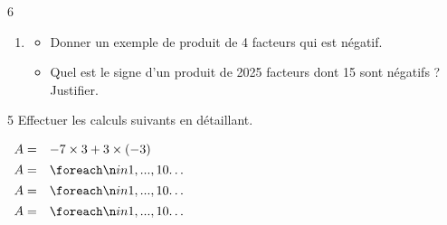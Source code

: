 \documentclass[a4paper]{book}
\begin{document}
{\begin{exerciceNote}{6}
\begin{enumerate}
\begin{enumerate}
\begin{itemize}
                    \medskip
                    
                    \item Si ce nombre est \points[10], alors le résultat est \points[10]
                \end{itemize}
            \end{enumerate}

            \item \begin{itemize}
                \item Donner un exemple de produit de 4 facteurs qui est négatif.

                \medskip

                \points[30]

                \item Quel est le signe d'un produit de 2025 facteurs dont 15 sont négatifs ? Justifier.

                \medskip

                \points[30]
            \end{itemize}
        \end{enumerate}
    \end{exerciceNote}


     \begin{exerciceNote}{5}
        Effectuer les calculs suivants en détaillant.

        \medskip

        \begin{minipage}{0.30\linewidth}
            $\begin{array}{ll}
                A = & -7\times3+ 3\times(-3) \\[1ex]
                A = & \points[10]\\[1ex]
                A = & \points[10]\\[1ex]
                A = & \points[10]
            \end{array}$

            \vspace{1cm}


\end{minipage}
\end{exerciceNote}}
\end{document}
